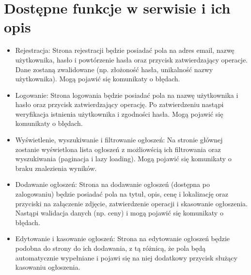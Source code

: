 \documentclass{article}
\begin{document}
\section{Dostępne funkcje w serwisie i ich opis}
{\fontsize{12}{12}\selectfont
    
\begin{itemize}
    \item Rejestracja:
    Strona rejestracji będzie posiadać pola na adres email, nazwę użytkownika, hasło i powtórzenie hasła oraz przycisk zatwierdzający operacje. Dane zostaną zwalidowane (np. złożoność hasła, unikalność nazwy użytkownika). Mogą pojawić się komunikaty o błędach.
    
    \item Logowanie: 
    Strona logowania będzie posiadać pola na nazwę użytkownika i hasło oraz przycisk zatwierdzający operację. Po zatwierdzeniu nastąpi weryfikacja istnienia użytkownika i zgodności hasła. Mogą pojawić się komunikaty o błędach.
    
    \item Wyświetlenie, wyszukiwanie i filtrowanie ogłoszeń:
    Na stronie głównej zostanie wyświetlona lista ogłoszeń z możliowścią ich filtrowania oraz wyszukiwania (paginacja i lazy loading). Mogą pojawić się komunikaty o braku znalezienia wyników.
    
    \item Dodawanie ogłoszeń:
    Strona na dodawanie ogłoszeń (dostępna po zalogowaniu) będzie posiadać pola na tytuł, opis, cenę i lokalizację oraz przyciski na załączenie zdjęcie, zatwierdzenie operacji i skasowanie ogłoszenia. Nastąpi walidacja danych (np. ceny) i mogą pojawić się komunikaty o błędach.
    
    \item Edytowanie i kasowanie ogłoszeń: 
    Strona na edytowanie ogłoszeń będzie podobna do strony do ich dodawania, z tą różnicą, że pola będą automatycznie wypełniane i pojawi się na niej dodatkowy przycisk służący kasowaniu ogłoszenia.

    
\end{itemize}
}
\end{document}
